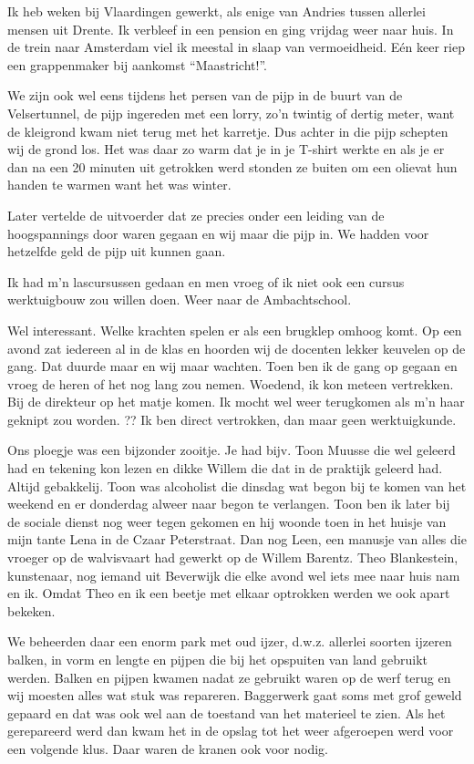 \documentclass[10pt,twoside,openright]{memoir}
\begin{document}
Ik heb weken bij Vlaardingen gewerkt, als enige van Andries tussen allerlei mensen uit Drente. Ik verbleef in een pension en ging vrijdag weer naar huis. In de trein naar Amsterdam viel ik meestal in slaap van vermoeidheid. Eén keer riep een grappenmaker bij aankomst ``Maastricht!''. 

We zijn ook wel eens tijdens het persen van de pijp in de buurt van de Velsertunnel, de pijp ingereden met een lorry, zo'n twintig of dertig meter, want de kleigrond kwam niet terug met het karretje. Dus achter in die pijp schepten wij de grond los. Het was daar zo warm dat je in je T-shirt werkte en als je er dan na een 20 minuten uit getrokken werd stonden ze buiten om een olievat hun handen te warmen want het was winter. 

Later vertelde de uitvoerder dat ze precies onder een leiding van de hoogspannings door waren gegaan en wij maar die pijp in. We hadden voor hetzelfde geld de pijp uit kunnen gaan.

Ik had m’n lascursussen gedaan en men vroeg of ik niet ook een cursus werktuigbouw zou willen doen. Weer naar de Ambachtschool. 

Wel interessant. Welke krachten spelen er als een brugklep omhoog komt. Op een avond zat iedereen al in de klas en hoorden wij de docenten lekker keuvelen op de gang. Dat duurde maar en wij maar wachten. Toen ben ik de gang op gegaan en vroeg de heren of het nog lang zou nemen. Woedend, ik kon meteen vertrekken. Bij de direkteur op het matje komen. Ik mocht wel weer terugkomen als m’n haar geknipt zou worden. ?? Ik ben direct vertrokken, dan maar geen werktuigkunde.

Ons ploegje was een bijzonder zooitje. Je had bijv. Toon Muusse die wel geleerd had en tekening kon lezen en dikke Willem die dat in de praktijk geleerd had. Altijd gebakkelij. Toon was alcoholist die dinsdag wat begon bij te komen van het weekend en er donderdag alweer naar begon te verlangen. Toon ben ik later bij de sociale dienst nog weer tegen gekomen en hij woonde toen in het huisje van mijn tante Lena in de Czaar Peterstraat. Dan nog Leen, een manusje van alles die vroeger op de walvisvaart had gewerkt op de Willem Barentz. Theo Blankestein, kunstenaar, nog iemand uit Beverwijk die elke avond wel iets mee naar huis nam en ik. Omdat Theo en ik een beetje met elkaar optrokken werden we ook apart bekeken. 

We beheerden daar een enorm park met oud ijzer, d.w.z. allerlei soorten ijzeren balken, in vorm en lengte en pijpen die bij het opspuiten van land gebruikt werden. Balken en pijpen kwamen nadat ze gebruikt waren op de werf terug en wij moesten alles wat stuk was repareren. Baggerwerk gaat soms met grof geweld gepaard en dat was ook wel aan de toestand van het materieel te zien. Als het gerepareerd werd dan kwam het in de opslag tot het weer afgeroepen werd voor een volgende klus. Daar waren de kranen ook voor nodig. 
\end{document}
